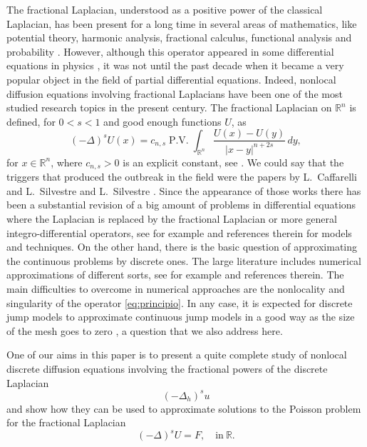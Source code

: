 \documentclass[a4paper,11pt,reqno]{amsart}
\newcommand{\R}{\mathbb{R}}
\newcommand{\PV}{\operatorname{P.V.}}
\theoremstyle{definition}
\numberwithin{equation}{section}
\begin{document}
The fractional Laplacian, understood as a positive power of the classical Laplacian,
has been present for a long time in several areas of mathematics, like
potential theory, harmonic analysis, fractional calculus, functional analysis and probability
\cite{Getoor, Landkof, japoneses, StSingular}.
However, although this operator appeared in some differential equations in physics \cite{MK},
it was not until the past decade when it became a very popular object in
the field of partial differential equations. Indeed, nonlocal diffusion
equations involving fractional Laplacians have been
one of the most studied research topics in the present century.
The fractional  Laplacian on $\R^n$ is defined,
for $0<s<1$ and good enough functions $U$, as
\begin{equation}
\label{eq:principio}
(-\Delta)^sU(x) =  c_{n,s}\PV \int_{\R^n} \frac{U(x)-U(y)}{|x-y|^{n+2s}}\,dy,
\end{equation}
for $x\in\R^n$, where $c_{n,s}>0$ is an explicit constant, see \cite{Landkof, Stinga-Torrea}.
We could say that the triggers that produced the outbreak in the field
were the papers by L.~Caffarelli and L.~Silvestre \cite{Caffarelli-Silvestre}
and L.~Silvestre \cite{Silvestre-CPAM}.
Since the appearance of those works there has been
a substantial revision of a big amount of problems in differential equations where the
Laplacian is replaced by the fractional Laplacian or
more general integro-differential operators, see for example \cite{Caffarelli, Caffarelli-Stinga, Gale,
Roncal-Stinga, RS, Savin-Valdinoci-1, Savin-Valdinoci-2, Silvestre-CPAM, Stinga, Stinga-Torrea} and references
therein for models and techniques. On the other hand,
there is the basic question of approximating the continuous problems by discrete
ones. The large literature includes numerical approximations of different sorts,
see for example \cite{Acosta-Borthagaray, Bonito-Pasciak, DelTeso, Huang-Oberman, Lenzmann, Nochetto}
and references therein. The main difficulties to overcome in numerical approaches are the nonlocality
and singularity of the operator \eqref{eq:principio}.
In any case, it is expected for discrete jump models to approximate continuous jump
models in a good way as the size of the mesh goes to zero \cite{MK}, a question that we also address here.

One of our aims in this paper is to present a quite complete study of nonlocal discrete diffusion equations
involving the fractional powers of the discrete Laplacian
$$
(-\Delta_h)^su
$$
and show how they can be used to approximate solutions to the Poisson problem for the fractional Laplacian
\begin{equation}
\label{eq:PoissonProblem}
(-\Delta)^sU=F,\quad\text{in}~\R.
\end{equation}
\end{document}
